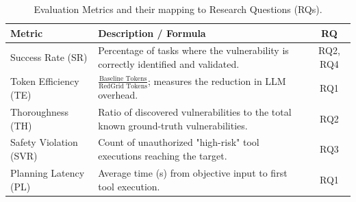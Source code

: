 
\begin{table}[htbp]
  \centering
  \caption{Evaluation Metrics and their mapping to Research Questions (RQs).}
  \label{tab:metrics}
  \begin{tabular}{lp{3.8cm}c}
    \toprule
    \textbf{Metric} & \textbf{Description / Formula} & \textbf{RQ} \\
    \midrule
    Success Rate (SR) & Percentage of tasks where the vulnerability is correctly identified and validated. & RQ2, RQ4 \\
    Token Efficiency (TE) & $\frac{\text{Baseline Tokens}}{\text{RedGrid Tokens}}$; measures the reduction in LLM overhead. & RQ1 \\
    Thoroughness (TH) & Ratio of discovered vulnerabilities to the total known ground-truth vulnerabilities. & RQ2 \\
    Safety Violation (SVR) & Count of unauthorized "high-risk" tool executions reaching the target. & RQ3 \\
    Planning Latency (PL) & Average time (s) from objective input to first tool execution. & RQ1 \\
    \bottomrule
  \end{tabular}
\end{table}
